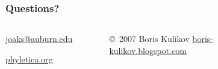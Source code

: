 \begin{frame}
    \frametitle{Questions?}    
    \begin{columns}[c]

        \begin{minipage}[c][\frametextheight][c]{\columnwidth}
        \begin{center}
            {
            \Large
            \href{mailto:joaks@auburn.edu}{joaks@auburn.edu}

            \bigskip
            \href{http://phyletica.org/}{phyletica.org}
            }
        \end{center}
        \end{minipage}


        \begin{minipage}[t][\frametextheight][b]{\columnwidth}
            \begin{figure}
                \begin{center}
                \vspace{-2.0mm}
                \caption{\tiny \copyright~2007 Boris Kulikov \href{http://boris-kulikov.blogspot.com/}{boris-kulikov.blogspot.com}}
                \end{center}
            \end{figure}
        \end{minipage}

    \end{columns}
\end{frame}
